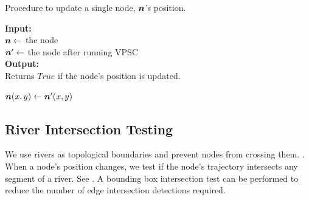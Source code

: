 \begin{algorithm}[tb!]
    \caption{Procedure to update a single node, $ \bm{n} $'s position.}\label{alg:move position}

    \textbf{Input:} \\
    $ \bm{n} \gets $ the node \\
    $ \bm{n}' \gets $ the node after running VPSC \\

    \textbf{Output:} \\
    Returns $ True $ if the node's position is updated. \\

    \begin{algorithmic}[1]
            \item[] 
            \State {}
        \EndIf

        \State $ \bm{n}(x,y) \gets \bm{n}'(x,y) $

        \State {}
        \EndProcedure
    \end{algorithmic}
\end{algorithm}


\subsection{River Intersection Testing}

We use rivers as topological boundaries and prevent nodes from crossing them. . When a node's position changes, we test if the node's trajectory intersects any segment of a river. See . A bounding box intersection test can be performed to reduce the number of edge intersection detections required.


